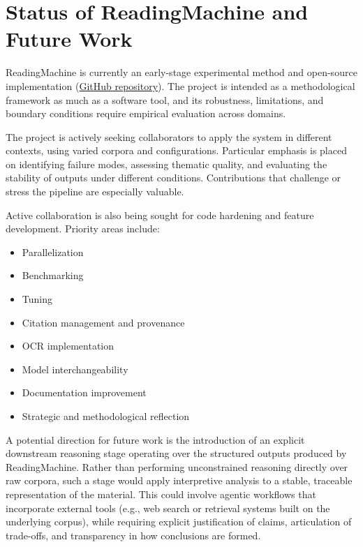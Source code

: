 \documentclass[
  11pt,
]{article}
\providecommand{\tightlist}{%
  \setlength{\itemsep}{0pt}\setlength{\parskip}{0pt}}
\begin{document}
\section{Status of ReadingMachine and Future
Work}\label{status-of-readingmachine-and-future-work}

ReadingMachine is currently an early-stage experimental method and
open-source implementation
(\href{https://github.com/morrisseyj/ReadingMachine/}{GitHub repository}).
The project is intended as a methodological framework as much as a software 
tool, and its robustness, limitations, and boundary conditions require empirical
evaluation across domains.

The project is actively seeking collaborators to apply the system in
different contexts, using varied corpora and configurations. Particular
emphasis is placed on identifying failure modes, assessing thematic
quality, and evaluating the stability of outputs under different
conditions. Contributions that challenge or stress the pipeline are
especially valuable.

Active collaboration is also being sought for code hardening and feature
development. Priority areas include:

\begin{itemize}
\tightlist
\item
  Parallelization
\item
  Benchmarking
\item
  Tuning
\item
  Citation management and provenance
\item
  OCR implementation
\item
  Model interchangeability
\item
  Documentation improvement
\item
  Strategic and methodological reflection
\end{itemize}

A potential direction for future work is the introduction of an explicit
downstream reasoning stage operating over the structured outputs
produced by ReadingMachine. Rather than performing unconstrained
reasoning directly over raw corpora, such a stage would apply
interpretive analysis to a stable, traceable representation of the
material. This could involve agentic workflows that incorporate external
tools (e.g., web search or retrieval systems built on the underlying
corpus), while requiring explicit justification of claims, articulation
of trade-offs, and transparency in how conclusions are formed.
\end{document}
